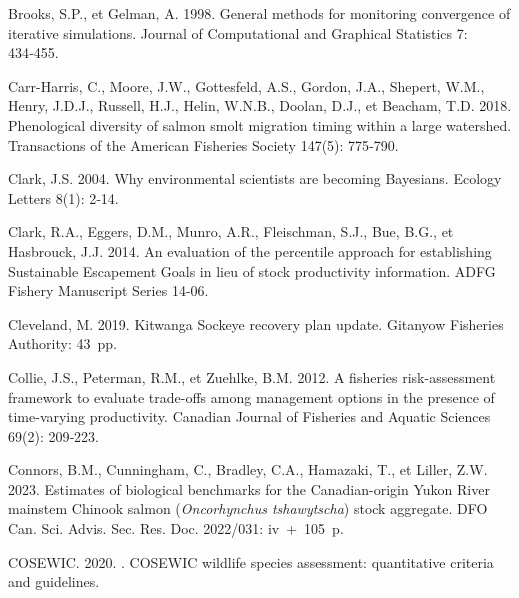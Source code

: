 \documentclass[french,11pt]{book}
\begin{document}
\begin{CSLReferences}{1}{0}
Brooks, S.P., et Gelman, A. 1998. General methods for monitoring convergence of iterative simulations. Journal of Computational and Graphical Statistics 7: 434‑455.

Carr-Harris, C., Moore, J.W., Gottesfeld, A.S., Gordon, J.A., Shepert, W.M., Henry, J.D.J., Russell, H.J., Helin, W.N.B., Doolan, D.J., et Beacham, T.D. 2018. {Phenological diversity of salmon smolt migration timing within a large watershed.} {Transactions of the American Fisheries Society} 147(5): 775‑790.

Clark, J.S. 2004. {Why environmental scientists are becoming Bayesians}. Ecology Letters 8(1): 2‑14.

Clark, R.A., Eggers, D.M., Munro, A.R., Fleischman, S.J., Bue, B.G., et Hasbrouck, J.J. 2014. {An evaluation of the percentile approach for establishing Sustainable Escapement Goals in lieu of stock productivity information}. ADFG Fishery Manuscript Series 14-06.

Cleveland, M. 2019. {Kitwanga Sockeye recovery plan update.} {Gitanyow Fisheries Authority}: 43~pp.

Collie, J.S., Peterman, R.M., et Zuehlke, B.M. 2012.{ A fisheries risk-assessment framework to evaluate trade-offs among management options in the presence of time-varying productivity}. {Canadian Journal of Fisheries and Aquatic Sciences} 69(2): 209‑223.

Connors, B.M., Cunningham, C., Bradley, C.A., Hamazaki, T., et Liller, Z.W. 2023. {Estimates of biological benchmarks for the Canadian-origin Yukon River mainstem Chinook salmon (}\emph{Oncorhynchus tshawytscha}{) stock aggregate}. {DFO Can. Sci. Advis. Sec. Res. Doc.} 2022/031: iv~+~105~p.

COSEWIC. 2020. . {COSEWIC wildlife species assessment: quantitative criteria and guidelines}.


\end{CSLReferences}
\end{document}
